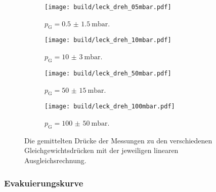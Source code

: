     \begin{figure}[h]
      \begin{subfigure}{0.48\textwidth}
        \centering
        \texttt{[image: build/leck\_dreh\_05mbar.pdf]}
        \caption{$p_\text{G} = \SI{0.5(15)}{\milli\bar}$.}
        \label{fig:dreh_leck_05}
      \end{subfigure}
      \hfill
      \begin{subfigure}{0.48\textwidth}
        \centering
        \texttt{[image: build/leck\_dreh\_10mbar.pdf]}
        \caption{$p_\text{G} = \SI{10(3)}{\milli\bar}$.}
        \label{fig:dreh_leck_10}
      \end{subfigure}
      \hfill
      \begin{subfigure}{0.48\textwidth}
        \centering
        \texttt{[image: build/leck\_dreh\_50mbar.pdf]}
        \caption{$p_\text{G} = \SI{50(15)}{\milli\bar}$.}
        \label{fig:dreh_leck_50}
      \end{subfigure}
      \hfill
      \begin{subfigure}{0.48\textwidth}
        \centering
        \texttt{[image: build/leck\_dreh\_100mbar.pdf]}
        \caption{$p_\text{G} = \SI{100(50)}{\milli\bar}$.}
        \label{fig:dreh_leck_100}
      \end{subfigure}
      \caption{Die gemittelten Drücke der Messungen zu den verschiedenen Gleichgewichtsdrücken mit der jeweiligen linearen Ausgleichsrechnung.}
      \label{fig:dreh_leck}
    \end{figure}

  \subsubsection{Evakuierungskurve}

